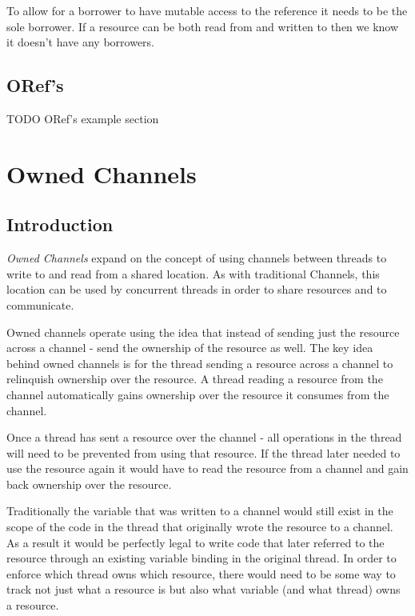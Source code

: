 \documentclass[onehalf,11pt]{beavtex}
\begin{document}
To allow for a borrower to have mutable access to the reference it needs to be
the sole borrower. If a resource can be both read from and written to then we
know it doesn't have any borrowers.


\section{ORef's}

TODO ORef's example section




\chapter{Owned Channels}

\section{Introduction}

\textit{Owned Channels} expand on the concept of using channels between threads
to write to and read from a shared location.   As with traditional Channels,
this location can be used by concurrent threads in order to share resources and
to communicate.


Owned channels operate using the idea that instead of sending just the
resource across a channel - send the ownership of the resource as well.
The key idea behind owned channels is for the thread sending a
resource across a channel to relinquish ownership over the resource.
A thread reading a resource from the channel automatically gains ownership over
the resource it consumes from the channel.

Once a thread has sent a resource over the channel - all operations in the thread
will need to be prevented from using that resource.
If the thread later needed to use the resource again it would have to read the
resource from a channel and gain back ownership over the resource.

Traditionally the variable that was written to a channel would still exist in the
scope of the code in the thread that originally wrote the resource to a channel.
As a result it would be perfectly legal to write code that later referred to the
resource through an existing variable binding in the original thread.
In order to enforce which thread owns which resource, there would need to be
some way to track not just what a resource is but also what variable (and what
thread) owns a resource.
\end{document}
